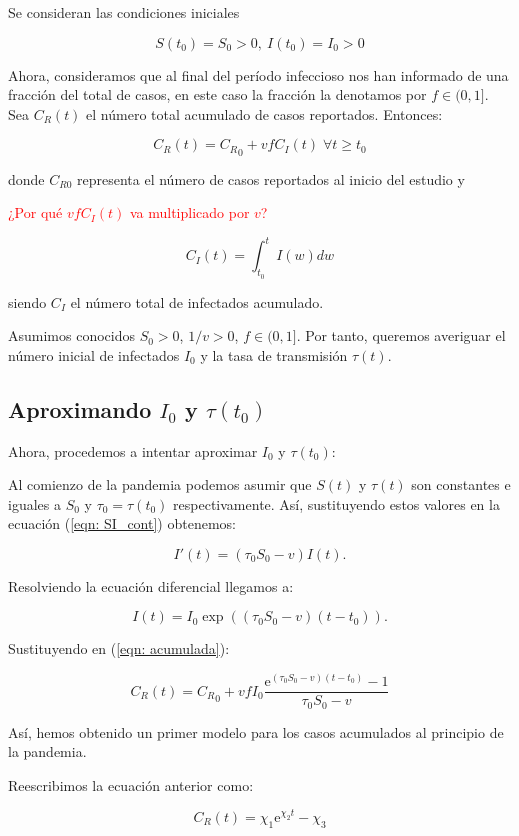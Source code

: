 Se consideran las condiciones iniciales

$$S(t_0)=S_0>0, \: I(t_0)=I_0>0$$

Ahora, consideramos que al final del período infeccioso nos han informado de una fracción del total de casos, en este caso la fracción la denotamos por $f\in (0,1]$. Sea $C_R(t)$ el número total acumulado de casos reportados. Entonces:

\begin{equation}
\label{eqn: acumulada}
C_R(t) = {C_R}_0 + vfC_I(t) \; \forall t \geq t_0
\end{equation}

donde $C_{R0}$ representa el número de casos reportados al inicio del estudio y 

\textcolor{red}{¿Por qué $vfC_I(t)$ va multiplicado por $v$?}

$$C_I(t) = \int_{t_0}^t I(w) dw $$

siendo $C_I$ el número total de infectados acumulado.

Asumimos conocidos $S_0 > 0$, $1/v>0$, $f\in (0,1]$. Por tanto, queremos averiguar el número inicial de infectados $I_0$ y la tasa de transmisión $\tau (t)$.

\subsection{Aproximando $I_0$ y $\tau (t_0)$}
Ahora, procedemos a intentar aproximar $I_0$ y $\tau (t_0)$:

Al comienzo de la pandemia podemos asumir que $S(t)$ y $\tau (t)$ son constantes e iguales a $S_0$ y $\tau_0 = \tau (t_0)$ respectivamente. Así, sustituyendo estos valores en la ecuación (\ref{eqn: SI_cont}) obtenemos:

$$I'(t) = (\tau_0 S_0 -v) I(t).$$

Resolviendo la ecuación diferencial llegamos a:

$$I(t) = I_0\exp{((\tau_0 S_0-v)(t-t_0))}.$$

Sustituyendo en (\ref{eqn: acumulada}):

$$C_R(t) = {C_R}_0 + vfI_0\frac{\mathrm{e}^{(\tau_0 S_0 -v)(t-t_0)} -1}{\tau_0 S_0-v}$$

Así, hemos obtenido un primer modelo para los casos acumulados al principio de la pandemia.

Reescribimos la ecuación anterior como:

\begin{equation}
\label{eqn: acumulada_modelo}
C_R(t) = \chi_1 \mathrm{e}^{\chi_2 t} -\chi_3
\end{equation}

